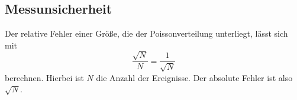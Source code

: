 \subsection{Messunsicherheit}
\label{sec:Messunsicherheit}
Der relative Fehler einer Größe, die der Poissonverteilung unterliegt, lässt sich mit
\begin{equation}
    \frac{\sqrt{N}}{N} = \frac{1}{\sqrt{N}}
\end{equation}
berechnen. Hierbei ist $N$ die Anzahl der Ereignisse. Der absolute Fehler ist also $\sqrt{N}$.
